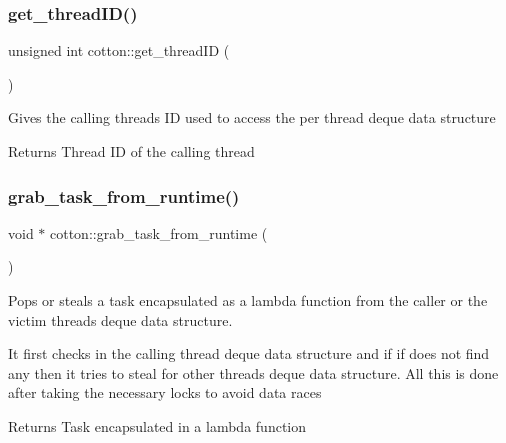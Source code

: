 \subsubsection{\texorpdfstring{get\+\_\+thread\+I\+D()}{get\_threadID()}}
{\footnotesize\ttfamily unsigned int cotton\+::get\+\_\+thread\+ID (\begin{DoxyParamCaption}{ }\end{DoxyParamCaption})}

Gives the calling thread\textquotesingle{}s ID used to access the per thread deque data structure

\begin{DoxyReturn}{Returns}
Thread ID of the calling thread 
\end{DoxyReturn}
\mbox{\label{cotton-runtime_8h_file_a1cae25b77bd884fcdcf2532663056d22}} 
\subsubsection{\texorpdfstring{grab\+\_\+task\+\_\+from\+\_\+runtime()}{grab\_task\_from\_runtime()}}
{\footnotesize\ttfamily void $\ast$ cotton\+::grab\+\_\+task\+\_\+from\+\_\+runtime (\begin{DoxyParamCaption}{ }\end{DoxyParamCaption})}

Pops or steals a task encapsulated as a lambda function from the caller or the victim thread\textquotesingle{}s deque data structure.

It first checks in the calling thread deque data structure and if if does not find any then it tries to steal for other threads\textquotesingle{} deque data structure. All this is done after taking the necessary locks to avoid data races

\begin{DoxyReturn}{Returns}
Task encapsulated in a lambda function 
\end{DoxyReturn}
\mbox{\label{cotton-runtime_8h_file_a4ea9036584fa3bd86fe8626dc05d295f}} 
